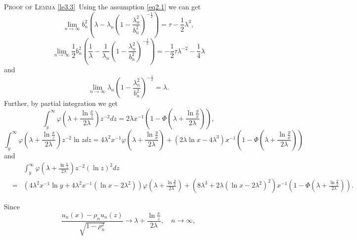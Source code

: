 \documentclass[10pt,twosided]{article}
\numberwithin{equation}{section}
\numberwithin{equation}{section}
\newcommand{\prooflem}[1]{\textsc{Proof of Lemma} \ref{#1}}
\newcommand{\COM}[1]{}
\begin{document}
\prooflem{le3.3}~Using the assumption \eqref{eq2.1} we can get
$$\lim_{n\to \infty}b_n^2\left(\lambda-\lambda_n\left(1-\frac{\lambda_n^2}{b_n^2}\right)^{-\frac{1}{2}} \right)
=\tau-\frac{1}{2}\lambda^3,$$
$$\lim_{n\to \infty}\frac{1}{2}b_n^2\left(\frac{1}{\lambda}-\frac{1}{\lambda_n}
\left(1-\frac{\lambda_n^2}{b_n^2}\right)^{-\frac{1}{2}}\right)=-\frac{1}{2}\tau
\lambda^{-2}-\frac{1}{4}\lambda$$
and
$$\lim_{n\to \infty}\lambda_n\left(1-\frac{\lambda_n^2}{b_n^2}\right)^{-\frac{1}{2}}=\lambda.$$
Further, by partial integration we get
$$\int_y^{\infty}\varphi\left(\lambda+\frac{\ln \frac{x}{z}}{2\lambda}\right)z^{-2}dz
=2\lambda x^{-1}\left(1-\Phi\left(\lambda+\frac{\ln \frac{y}{x}}{2\lambda}\right)\right),$$
$$\int_y^{\infty}\varphi\left(\lambda+\frac{\ln \frac{x}{z}}{2\lambda}\right)z^{-2}\ln zdz
=4\lambda^2 x^{-1}\varphi\left(\lambda+\frac{\ln \frac{y}{x}}{2\lambda}\right)
+(2\lambda \ln x-4\lambda^3) x^{-1}\left(1-\Phi\left(\lambda+\frac{\ln \frac{y}{x}}{2\lambda}\right)\right)$$
and
\begin{eqnarray*}&&\int_y^{\infty}\varphi\left(\lambda+\frac{\ln \frac{x}{z}}{2\lambda}\right)z^{-2}(\ln z)^2dz\\
&=&(4\lambda^2x^{-1}\ln y+4\lambda^2 x^{-1}(\ln x-2\lambda^2))\varphi\left(\lambda+\frac{\ln \frac{y}{x}}{2\lambda}\right)
+(8\lambda^3+2\lambda(\ln x-2\lambda^2)^2) x^{-1}\left(1-\Phi\left(\lambda+\frac{\ln \frac{y}{x}}{2\lambda}\right)\right).
\end{eqnarray*}
\COM{
For $y<z<b_{n}^4$, by using \eqref{addeq3.13} we have
\begin{eqnarray*}
&&\left(\lambda_n+\frac{\ln x/z}{2\lambda_n}+\frac{\lambda_n\ln z}{b^2_n}+\frac{(\ln x)^2-(\ln z)^2}{4b_n^2\lambda_n}+\frac{(\ln z)^2\lambda_n}{2b_n^4}
+\frac{(\ln x)^3-\rho_n(\ln z)^3}{12b_n^4\lambda_n}-\frac{\rho_n (\ln z)^4}{2b_n^6\lambda_n}\right)\left(1-\frac{\lambda_n^2}{b_n^2}\right)^{-\frac{1}{2}}\\
&\le&\frac{u_n(x)-\rho_n u_n(z)}{\sqrt{1-\rho_n^2}}=\frac{b_ne^{b_n^{-2}\ln x}-\rho_nb_ne^{b_n^{-2}\ln z}}{\sqrt{1-\rho_n^2}}\\
&\le&\left(\lambda_n+\frac{\ln x/z}{2\lambda_n}+\frac{\lambda_n\ln z}{b^2_n}+\frac{(\ln x)^2-(\ln z)^2}{4b_n^2\lambda_n}+\frac{(\ln z)^2\lambda_n}{2b_n^4}
+\frac{(\ln x)^3-\rho_n(\ln z)^3}{12b_n^4\lambda_n} + \frac{(\ln x)^4}{2b_{n}^6\lambda_{n}}\right)\left(1-\frac{\lambda_n^2}{b_n^2}\right)^{-\frac{1}{2}}.
\end{eqnarray*}
}
Since
\begin{equation}\label{addeq3.8}
\frac{u_n(x)-\rho_n u_n(z)}{\sqrt{1-\rho_n^2}}\to \lambda+\frac{\ln \frac{x}{z}}{2\lambda},\quad n\to \infty,
\end{equation}
\end{document}
